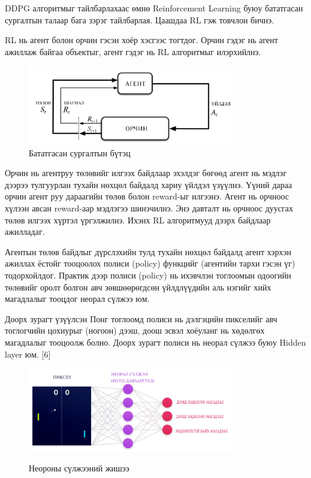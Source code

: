 \documentclass[12pt,A4]{report}
\begin{document}
DDPG алгоритмыг тайлбарлахаас өмнө Reinforcement Learning буюу бататгасан сургалтын талаар бага зэрэг тайлбарлая. Цаашдаа RL гэж товчлон бичнэ.

RL нь агент болон орчин гэсэн хоёр хэсгээс тогтдог. Орчин гэдэг нь агент ажиллаж байгаа объектыг, агент гэдэг нь RL алгоритмыг илэрхийлнэ.

\begin{figure}[H]
\centering
\includegraphics[width=0.8\textwidth]{./images/rl}
\caption{Бататгасан сургалтын бүтэц}
\end{figure}

Орчин нь агентруу төлөвийг илгээх байдлаар эхэлдэг бөгөөд агент нь мэдлэг дээрээ тулгуурлан тухайн нөхцөл байдалд хариу үйлдэл үзүүлнэ. Үүний дараа орчин агент руу дараагийн төлөв болон reward-ыг илгээнэ. Агент нь орчноос хүлээн авсан reward-аар мэдлэгээ шинэчилнэ. Энэ давталт нь орчноос дуусгах төлөв илгээх хүртэл үргэлжилнэ. Ихэнх RL алгоритмууд дээрх байдлаар ажилладаг.

Агентын төлөв байдлыг дүрслэхийн тулд тухайн нөхцөл байдалд агент хэрхэн ажиллах ёстойг тооцоолох полиси (policy) функцийг (агентийн тархи гэсэн үг) тодорхойлдог. Практик дээр полиси (policy) нь ихэвчлэн тоглоомын одоогийн төлөвийг оролт болгон авч зөвшөөрөгдсөн үйлдлүүдийн аль нэгийг хийх магадлалыг тооцдог неорал сүлжээ юм.

Доорх зурагт үзүүлсэн Понг тоглоомд полиси нь дэлгэцийн пикселийг авч тоглогчийн цохиурыг (ногоон) дээш, доош эсвэл хоёуланг нь хөдөлгөх магадлалыг тооцоолж болно. Доорх зурагт полиси нь неорал сүлжээ буюу Hidden layer юм. [6]

\begin{figure}[H]
\centering
\href{https://openai.com/content/images/2017/03/first-graphic-1.png}{\includegraphics[width=0.8\textwidth]{./images/neural_network}}
\caption{Неороны сүлжээний жишээ}
\end{figure}
\end{document}
